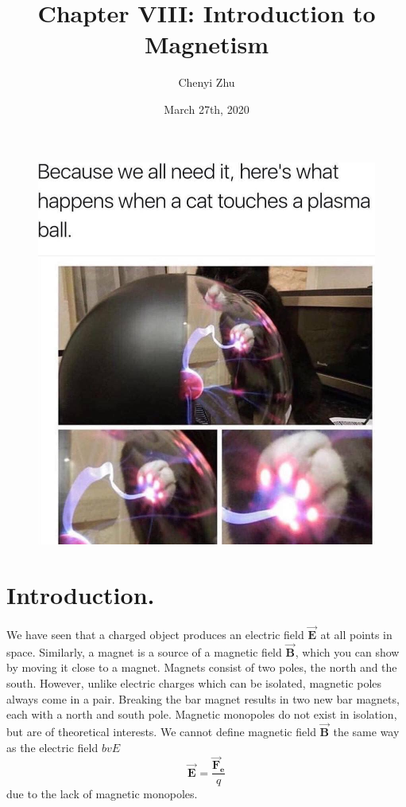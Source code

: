 \documentclass[11pt, letterpaper]{article}
\title{Chapter VIII: Introduction to Magnetism}
\author{Chenyi Zhu}
\date{March 27th, 2020}
\theoremstyle{definition}
\theoremstyle{remark}
\newcommand{\bv}[2][]{\bm{\vec{#2}_{#1}}}
\begin{document}
\begin{titlingpage}
	\maketitle
	
	\begin{figure}[h!]
		\centering
		\includegraphics[scale=0.3]{cat}
		\label{fig:flux}
	\end{figure}
		
\end{titlingpage}

\section{Introduction.}\label{sec:intro}
We have seen that a charged object produces an electric field $\bv{E}$ at all points in space. Similarly, a magnet is a source of a magnetic field $\bv{B}$, which you can show by moving it close to a magnet. Magnets consist of two poles, the north and the south. However, unlike electric charges which can be isolated, magnetic poles always come in a pair. Breaking the bar magnet results in two new bar magnets, each with a north and south pole. Magnetic monopoles do not exist in isolation, but are of theoretical interests. We cannot define magnetic field $\bv{B}$ the same way as the electric field $bv{E}$ \[\bv{E} = \frac{\bv[e]{F}}{q}\] due to the lack of magnetic monopoles. 
\end{document}

